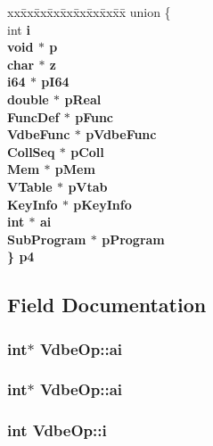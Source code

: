 \begin{CompactItemize}
\begin{tabbing}
\end{tabbing}\item 
\begin{tabbing}
xx\=xx\=xx\=xx\=xx\=xx\=xx\=xx\=xx\=\kill
union \{\\
\>int \bf{i}\\
\>void $\ast$ \bf{p}\\
\>char $\ast$ \bf{z}\\
\>\bf{i64} $\ast$ \bf{pI64}\\
\>double $\ast$ \bf{pReal}\\
\>\bf{FuncDef} $\ast$ \bf{pFunc}\\
\>\bf{VdbeFunc} $\ast$ \bf{pVdbeFunc}\\
\>\bf{CollSeq} $\ast$ \bf{pColl}\\
\>\bf{Mem} $\ast$ \bf{pMem}\\
\>\bf{VTable} $\ast$ \bf{pVtab}\\
\>\bf{KeyInfo} $\ast$ \bf{pKeyInfo}\\
\>int $\ast$ \bf{ai}\\
\>\bf{SubProgram} $\ast$ \bf{pProgram}\\
\} \bf{p4}\\

\end{tabbing}\end{CompactItemize}


\subsection{Field Documentation}
\subsubsection{\setlength{\rightskip}{0pt plus 5cm}int$\ast$ \bf{Vdbe\-Op::ai}}\label{structVdbeOp_889f70cdebfe2978787f25e195369d11}


\subsubsection{\setlength{\rightskip}{0pt plus 5cm}int$\ast$ \bf{Vdbe\-Op::ai}}\label{structVdbeOp_889f70cdebfe2978787f25e195369d11}


\subsubsection{\setlength{\rightskip}{0pt plus 5cm}int \bf{Vdbe\-Op::i}}\label{structVdbeOp_cedbbb234995e9a37f7f57d23bf9e849}


